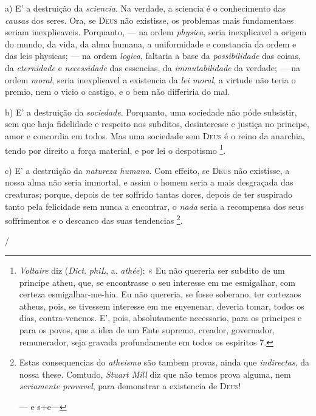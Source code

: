  a) E' a destruição da \emph{sciencia}. Na verdade, a sciencia é o conhecimento das \emph{causas} dos seres. Ora, se \textsc{Deus} não existisse, os problemas mais fundamentaes seriam inexplieaveis. Porquanto, --- na ordem \emph{physica}, seria inexplicavel a origem do mundo, da vida, da alma humana, a uniformidade e constancia da ordem e das leis physicas; --- na ordem \emph{logica}, faltaria a base da \emph{possibilidade} das coisas, da \emph{eternidade} e \emph{necessidade} das essencias, da \emph{immutabilidade} da verdade; --- na ordem \emph{moral}, seria inexplieavel a existencia da \emph{lei moral}, a virtude não teria o premio, nem o vicio o castigo, e o bem não differiria do mal.

b) E' a destruição da \emph{sociedade}. Porquanto, uma sociedade não póde subsistir, sem que haja fidelidade e respeito nos subditos, desinteresse e justiça no principe, amor e concordia em todos. Mas uma sociedade sem \textsc{Deus} é o reino da anarchia, tendo por direito a força material, e por lei o despotismo \footnote{\emph{Voltaire} diz (\emph{Dict}. \emph{phiL}, a. \emph{athée}): « Eu não quereria ser subdito de um principe atheu, que, se encontrasse o seu interesse em me esmigalhar, com certeza esmigalhar-me-hia. Eu não quereria, se fosse soberano, ter cortezaos atheus, pois, se tivessem interesse em me enyenenar, deveria tomar, todos os dias, contra-venenos. E', pois, absolutamente necessario, para os principes e para os povos, que a idea de um Ente supremo, creador, governador, remunerador, seja gravada profundamente em todos os espiritos 7.}.

c) E' a destruição da \emph{natureza humana}. Com effeito, se \textsc{Deus} não existisse, a nossa alma não seria immortal, e assim o homem seria a mais desgraçada das creaturas; porque, depois de ter soffrido tantas dores, depois de ter suspirado tanto pela felicidade sem nunca a encontrar, o \emph{nada} seria a recompensa dos seus soffrimentos e o descanco das suas tendencias \footnote{Estas consequencias do \emph{atheismo} são tambem provas, ainda que \emph{indirectas}, da nossa these. Comtudo, \emph{Stuart Mill} diz que não temos prova alguma, nem \emph{seriamente provavel}, para demonstrar a existencia de \textsc{Deus}!\par --- e s+e---}.

/
